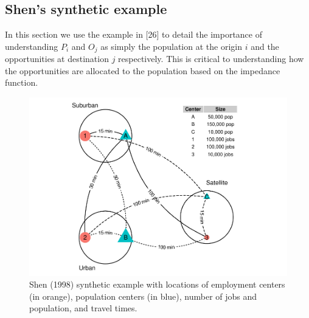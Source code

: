 \documentclass[10pt,letterpaper]{article}
\begin{document}
\hypertarget{shens-synthetic-example}{%
\subsection{Shen's synthetic example}\label{shens-synthetic-example}}

In this section we use the example in {[}26{]} to detail the importance
of understanding \(P_i\) and \(O_j\) as simply the population at the
origin \(i\) and the opportunities at destination \(j\) respectively.
This is critical to understanding how the opportunities are allocated to
the population based on the impedance function.

\begin{figure}

{\centering \includegraphics[width=1\linewidth]{Spatial-Availability-Refreshed_files/figure-latex/create-figure-with-toy-example-1} 

}

\caption{\label{fig:plot-toy-example} Shen (1998) synthetic example with locations of employment centers (in orange), population centers (in blue), number of jobs and population, and travel times.}\label{fig:create-figure-with-toy-example}
\end{figure}

 
  \providecommand{\huxb}[2]{\arrayrulecolor[RGB]{#1}\global\arrayrulewidth=#2pt}
  \providecommand{\huxvb}[2]{\color[RGB]{#1}\vrule width #2pt}
  \providecommand{\huxtpad}[1]{\rule{0pt}{#1}}
  \providecommand{\huxbpad}[1]{\rule[-#1]{0pt}{#1}}
\end{document}
